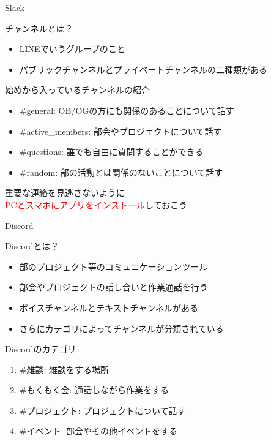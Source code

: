 \documentclass[12pt, unicode]{beamer}
\begin{document}
\begin{frame}{Slack}
    \begin{block}{チャンネルとは？}
        \begin{itemize}
            \item LINEでいうグループのこと
            \item パブリックチャンネルとプライベートチャンネルの二種類がある
        \end{itemize}
    \end{block}

    \begin{block}{始めから入っているチャンネルの紹介}
        \begin{itemize}
            \item \#general: OB/OGの方にも関係のあることについて話す
            \item \#active\_members: 部会やプロジェクトについて話す
            \item \#questions: 誰でも自由に質問することができる
            \item \#random: 部の活動とは関係のないことについて話す
        \end{itemize}
    \end{block}

    \begin{center}
        {\large 重要な連絡を見逃さないように\\\textcolor{red}{PCとスマホにアプリをインストール}しておこう}
    \end{center}
\end{frame}

\begin{frame}{Discord}
    \begin{block}{Discordとは？}
        \begin{itemize}
            \item 部のプロジェクト等のコミュニケーションツール
            \item 部会やプロジェクトの話し合いと作業通話を行う
            \item ボイスチャンネルとテキストチャンネルがある
            \item さらにカテゴリによってチャンネルが分類されている
        \end{itemize}
    \end{block}

    \begin{block}{Discordのカテゴリ}
        \begin{enumerate}
            \item \#雑談: 雑談をする場所
            \item \#もくもく会: 通話しながら作業をする
            \item \#プロジェクト: プロジェクトについて話す
            \item \#イベント: 部会やその他イベントをする
        \end{enumerate}
    \end{block}
\end{frame}
\end{document}
